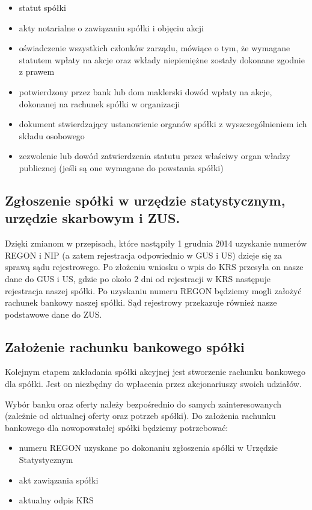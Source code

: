 \documentclass[11pt]{article}
\begin{document}
	\begin{itemize}
	
	\item statut spółki
	\item akty notarialne o zawiązaniu spółki i objęciu akcji
	\item oświadczenie wszystkich członków zarządu, mówiące o tym, że wymagane statutem wpłaty na akcje oraz wkłady niepieniężne zostały dokonane zgodnie z prawem
	\item potwierdzony przez bank lub dom maklerski dowód wpłaty na akcje, dokonanej na rachunek spółki w organizacji
	\item dokument stwierdzający ustanowienie organów spółki z wyszczególnieniem ich składu osobowego
	\item zezwolenie lub dowód zatwierdzenia statutu przez właściwy organ władzy publicznej (jeśli są one wymagane do powstania spółki)

	\end{itemize}
	
	\subsection{Zgłoszenie spółki w urzędzie statystycznym,  urzędzie skarbowym i ZUS.}
	
	Dzięki zmianom w przepisach, które nastąpiły 1 grudnia 2014 uzyskanie numerów REGON i NIP (a zatem rejestracja odpowiednio w GUS i US) dzieje się za sprawą sądu rejestrowego. Po złożeniu wniosku o wpis do KRS przesyła on nasze dane do GUS i US, gdzie po około 2 dni od rejestracji w KRS następuje rejestracja naszej spółki. Po uzyskaniu numeru REGON będziemy mogli założyć rachunek bankowy naszej spółki. Sąd rejestrowy przekazuje również nasze podstawowe dane do ZUS.
	
	\subsection{Założenie rachunku bankowego spółki}
	
	Kolejnym etapem zakładania spółki akcyjnej jest stworzenie rachunku bankowego dla spółki. Jest on niezbędny do wpłacenia przez akcjonariuszy swoich udziałów.
	
	  
Wybór banku oraz oferty należy bezpośrednio do samych zainteresowanych (zależnie od aktualnej oferty oraz potrzeb spółki). Do założenia rachunku bankowego dla nowopowstałej spółki będziemy potrzebować:
 \begin{itemize}
 	
	\item numeru REGON uzyskane po dokonaniu zgłoszenia spółki w Urzędzie Statystycznym
	\item akt zawiązania spółki
	\item aktualny odpis KRS 	
 	
 \end{itemize}
\end{document}
